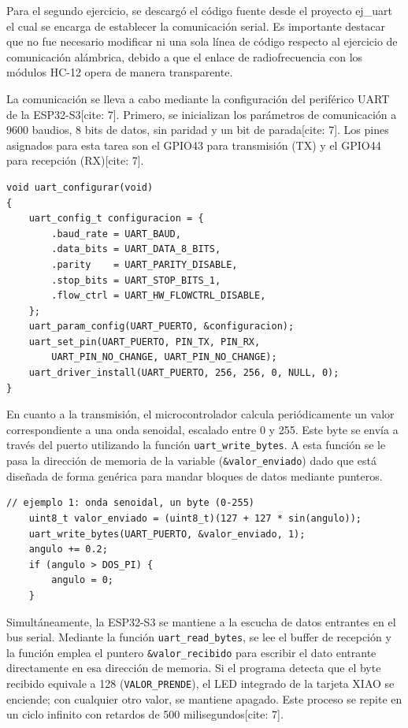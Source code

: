 \documentclass[12pt, letterpaper]{article}
\begin{document}
Para el segundo ejercicio, se descargó el código fuente desde el proyecto ej\_uart el cual se encarga de establecer la comunicación serial. Es importante destacar que no fue necesario modificar ni una sola línea de código respecto al ejercicio de comunicación alámbrica, debido a que el enlace de radiofrecuencia con los módulos HC-12 opera de manera transparente.

La comunicación se lleva a cabo mediante la configuración del periférico UART de la ESP32-S3[cite: 7]. Primero, se inicializan los parámetros de comunicación a 9600 baudios, 8 bits de datos, sin paridad y un bit de parada[cite: 7]. Los pines asignados para esta tarea son el GPIO43 para transmisión (TX) y el GPIO44 para recepción (RX)[cite: 7].

\begin{lstlisting}[style=cstyle, caption={Configuración del puerto UART}, label={lst:configuracion}]
void uart_configurar(void)
{
    uart_config_t configuracion = {
        .baud_rate = UART_BAUD,
        .data_bits = UART_DATA_8_BITS,
        .parity    = UART_PARITY_DISABLE,
        .stop_bits = UART_STOP_BITS_1,
        .flow_ctrl = UART_HW_FLOWCTRL_DISABLE,
    };
    uart_param_config(UART_PUERTO, &configuracion);
    uart_set_pin(UART_PUERTO, PIN_TX, PIN_RX,
        UART_PIN_NO_CHANGE, UART_PIN_NO_CHANGE);
    uart_driver_install(UART_PUERTO, 256, 256, 0, NULL, 0);
}
\end{lstlisting}

En cuanto a la transmisión, el microcontrolador calcula periódicamente un valor correspondiente a una onda senoidal, escalado entre 0 y 255. Este byte se envía a través del puerto utilizando la función \texttt{uart\_write\_bytes}. A esta función se le pasa la dirección de memoria de la variable (\texttt{\&valor\_enviado}) dado que está diseñada de forma genérica para mandar bloques de datos mediante punteros.

\begin{lstlisting}[style=cstyle, caption={Transmisión de datos (Tx)}, label={lst:transmision}]
    // ejemplo 1: onda senoidal, un byte (0-255)
    uint8_t valor_enviado = (uint8_t)(127 + 127 * sin(angulo));
    uart_write_bytes(UART_PUERTO, &valor_enviado, 1);
    angulo += 0.2;
    if (angulo > DOS_PI) {
        angulo = 0;
    }
\end{lstlisting}

Simultáneamente, la ESP32-S3 se mantiene a la escucha de datos entrantes en el bus serial. Mediante la función \texttt{uart\_read\_bytes}, se lee el buffer de recepción y la función emplea el puntero \texttt{\&valor\_recibido} para escribir el dato entrante directamente en esa dirección de memoria. Si el programa detecta que el byte recibido equivale a 128 (\texttt{VALOR\_PRENDE}), el LED integrado de la tarjeta XIAO se enciende; con cualquier otro valor, se mantiene apagado. Este proceso se repite en un ciclo infinito con retardos de 500 milisegundos[cite: 7].
\end{document}
